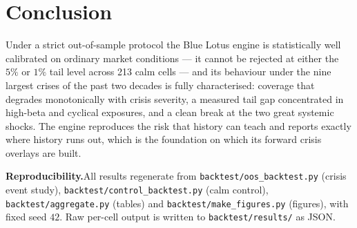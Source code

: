 \documentclass[11pt]{article}
\begin{document}
\section{Conclusion}
Under a strict out-of-sample protocol the Blue Lotus engine is statistically
well calibrated on ordinary market conditions --- it cannot be rejected at
either the $5\%$ or $1\%$ tail level across 213 calm cells --- and its
behaviour under the nine largest crises of the past two decades is fully
characterised: coverage that degrades monotonically with crisis severity, a
measured tail gap concentrated in high-beta and cyclical exposures, and a clean
break at the two great systemic shocks. The engine reproduces the risk that
history can teach and reports exactly where history runs out, which is the
foundation on which its forward crisis overlays are built.

\vspace{1em}
\noindent\textbf{Reproducibility.}\quad All results regenerate from
\texttt{backtest/oos\_backtest.py} (crisis event study),
\texttt{backtest/control\_backtest.py} (calm control),
\texttt{backtest/aggregate.py} (tables) and \texttt{backtest/make\_figures.py}
(figures), with fixed seed $42$. Raw per-cell output is written to
\texttt{backtest/results/} as JSON.
\end{document}
